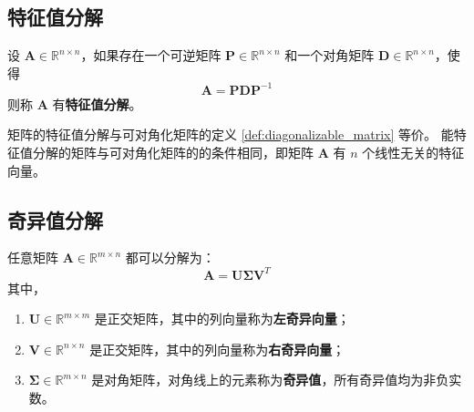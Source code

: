 \subsection{特征值分解}
\begin{definition}
    设 $\mathbf{A} \in \mathbb{R}^{n \times n}$，如果存在一个可逆矩阵 $\mathbf{P} \in \mathbb{R}^{n \times n}$ 和一个对角矩阵 $\mathbf{D} \in \mathbb{R}^{n \times n}$，使得
    \[
        \mathbf{A} = \mathbf{P} \mathbf{D} \mathbf{P}^{-1}
    \]
    则称 $\mathbf{A}$ 有\textbf{特征值分解}。
\end{definition}

\begin{note}
    矩阵的特征值分解与可对角化矩阵的定义 \ref{def:diagonalizable_matrix} 等价。
    能特征值分解的矩阵与可对角化矩阵的的条件相同，即矩阵 $\mathbf{A}$ 有 $n$ 个线性无关的特征向量。
\end{note}
\vspace{1em}

\subsection{奇异值分解}
\begin{proposition}
    任意矩阵 $\mathbf{A} \in \mathbb{R}^{m \times n}$ 都可以分解为：
    \[
        \mathbf{A} = \mathbf{U} \boldsymbol{\Sigma} \mathbf{V}^T
    \]
    其中，
    \begin{enumerate}
        \item $\mathbf{U} \in \mathbb{R}^{m \times m}$ 是正交矩阵，其中的列向量称为\textbf{左奇异向量}；
        \item $\mathbf{V} \in \mathbb{R}^{n \times n}$ 是正交矩阵，其中的列向量称为\textbf{右奇异向量}；
        \item $\boldsymbol{\Sigma} \in \mathbb{R}^{m \times n}$ 是对角矩阵，对角线上的元素称为\textbf{奇异值}，所有奇异值均为非负实数。
    \end{enumerate}
\end{proposition}

